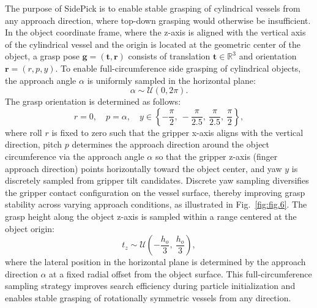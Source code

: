 \documentclass{ieeeaccess}
\begin{document}
The purpose of SidePick is to enable stable grasping of cylindrical vessels from any approach direction, where top-down grasping would otherwise be insufficient. In the object coordinate frame, where the z-axis is aligned with the vertical axis of the cylindrical vessel and the origin is located at the geometric center of the object, a grasp pose $\mathbf{g} = (\mathbf{t}, \mathbf{r})$ consists of translation $\mathbf{t} \in \mathbb{R}^3$ and orientation $\mathbf{r} = (r, p, y)$. To enable full-circumference side grasping of cylindrical objects, the approach angle $\alpha$ is uniformly sampled in the horizontal plane:
\begin{equation}
\alpha \sim \mathcal{U}(0, 2\pi).
\end{equation}
The grasp orientation is determined as follows:
\begin{equation}
r = 0, \quad p = \alpha, \quad y \in \left\{-\frac{\pi}{2},\ -\frac{\pi}{2.5},\ \frac{\pi}{2.5},\ \frac{\pi}{2}\right\},
\end{equation}
where roll $r$ is fixed to zero such that the gripper x-axis aligns with the vertical direction, pitch $p$ determines the approach direction around the object circumference via the approach angle $\alpha$ so that the gripper z-axis (finger approach direction) points horizontally toward the object center, and yaw $y$ is discretely sampled from gripper tilt candidates. Discrete yaw sampling diversifies the gripper contact configuration on the vessel surface, thereby improving grasp stability across varying approach conditions, as illustrated in Fig.~\ref{fig:fig.6}. The grasp height along the object z-axis is sampled within a range centered at the object origin:
\begin{equation}
t_z \sim \mathcal{U}\left(-\frac{h_{o}}{3},\ \frac{h_{o}}{3}\right),
\end{equation}
where the lateral position in the horizontal plane is determined by the approach direction $\alpha$ at a fixed radial offset from the object surface. This full-circumference sampling strategy improves search efficiency during particle initialization and enables stable grasping of rotationally symmetric vessels from any direction.
\end{document}
